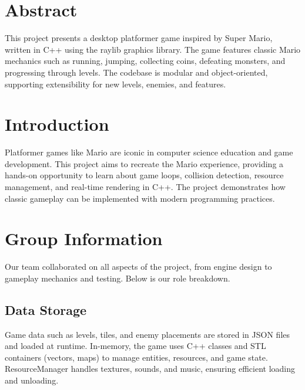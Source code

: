 

\clearpage
\begin{flushleft}
\section*{Abstract}
This project presents a desktop platformer game inspired by Super Mario, written in C++ using the raylib graphics library. The game features classic Mario mechanics such as running, jumping, collecting coins, defeating monsters, and progressing through levels. The codebase is modular and object-oriented, supporting extensibility for new levels, enemies, and features.

\section{Introduction}
Platformer games like Mario are iconic in computer science education and game development. This project aims to recreate the Mario experience, providing a hands-on opportunity to learn about game loops, collision detection, resource management, and real-time rendering in C++. The project demonstrates how classic gameplay can be implemented with modern programming practices.

\section{Group Information}
Our team collaborated on all aspects of the project, from engine design to gameplay mechanics and testing. Below is our role breakdown.

\begin{table}[H]

\end{table}

\begin{flushleft}
\section{Data Storage}
Game data such as levels, tiles, and enemy placements are stored in JSON files and loaded at runtime. In-memory, the game uses C++ classes and STL containers (vectors, maps) to manage entities, resources, and game state. ResourceManager handles textures, sounds, and music, ensuring efficient loading and unloading.


\end{flushleft}
\end{flushleft}
